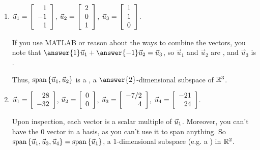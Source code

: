 \documentclass{ximera}
\begin{document}
\begin{example}
\begin{enumerate}
    \item $\vect{u}_1=\startmat{r} 1 \\ -1 \\ 1 \stopmat$, $\vect{u}_2=\startmat{r} 2 \\ 0 \\ 1 \stopmat$, $\vect{u}_3=\startmat{r} 1 \\ 1 \\ 0 \stopmat$.
    
    \begin{solution}
    
      If you use MATLAB or reason about the ways to combine the vectors, you note that $\answer{1}\vec{u}_1+\answer{-1}\vec{u}_2=\vec{u}_3$, so $\vec{u}_1$ and $\vec{u}_2$ are , and $\vec{u}_3$ is .
      
      Thus, $\sspan\set{\vect{u}_1,\vect{u}_2}$ is a , a $\answer{2}$-dimensional subspace of $\R^3$.

    \end{solution}

    \item $\vect{u}_1=\startmat{r} 28 \\ -32 \stopmat$, $\vect{u}_2=\startmat{r} 0 \\ 0 \stopmat$, $\vect{u}_3=\startmat{r} -7/2 \\ 4 \stopmat$, $\vect{u}_4=\startmat{r} -21 \\ 24 \stopmat$.
    
    \begin{solution}
    
      Upon inspection, each vector is a scalar multiple of $\vect{u}_1$. Moreover, you can't have the $0$ vector in a basis, as you can't use it to span anything. So $\sspan\set{\vect{u}_1, \vect{u}_3, \vect{u}_4}=\sspan\set{\vect{u}_1}$, a $1$-dimensional subspace (e.g. a ) in $\R^2$.

    \end{solution}
    
  \end{enumerate}

\end{example}
\end{document}
